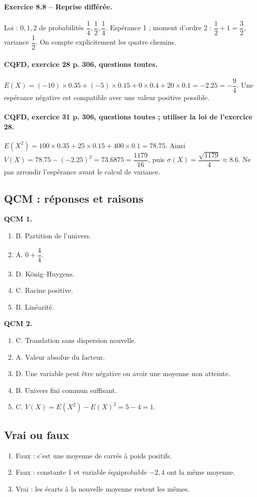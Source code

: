 \paragraph{Exercice 8.8 -- Reprise différée.} Loi : $0,1,2$ de probabilités $\dfrac{1}{4},\dfrac{1}{2},\dfrac{1}{4}$. Espérance 1 ; moment d’ordre 2 : $\dfrac{1}{2}+1=\dfrac{3}{2}$, variance $\dfrac{1}{2}$. On compte explicitement les quatre chemins.
\paragraph{CQFD, exercice 28 p. 306, questions toutes.} $E(X)=(-10)\times\num{0,35}+(-5)\times\num{0,15}+0\times\num{0,4}+20\times\num{0,1}=-\num{2,25}=-\dfrac94$. Une espérance négative est compatible avec une valeur positive possible.
\paragraph{CQFD, exercice 31 p. 306, questions toutes ; utiliser la loi de l’exercice 28.} $E(X^2)=100\times\num{0,35}+25\times\num{0,15}+400\times\num{0,1}=\num{78,75}$. Ainsi $V(X)=\num{78,75}-(-\num{2,25})^2=\num{73,6875}=\dfrac{1179}{16}$, puis $\sigma(X)=\dfrac{\sqrt{1179}}4\approx\num{8,6}$. Ne pas arrondir l’espérance avant le calcul de variance.
\subsection*{QCM : réponses et raisons}
\textbf{QCM 1.}
\begin{enumerate}
\item B. Partition de l’univers.
\item A. $0+\dfrac{4}{4}$.
\item D. König–Huygens.
\item C. Racine positive.
\item B. Linéarité.
\end{enumerate}
\textbf{QCM 2.}
\begin{enumerate}
\item C. Translation sans dispersion nouvelle.
\item A. Valeur absolue du facteur.
\item D. Une variable peut être négative ou avoir une moyenne non atteinte.
\item B. Univers fini commun suffisant.
\item C. $V(X)=E(X^2)-E(X)^2=5-4=1$.
\end{enumerate}
\subsection*{Vrai ou faux}
\begin{enumerate}
\item Faux : c’est une moyenne de carrés à poids positifs.
\item Faux : constante 1 et variable équiprobable $-2,4$ ont la même moyenne.
\item Vrai : les écarts à la nouvelle moyenne restent les mêmes.
\end{enumerate}
